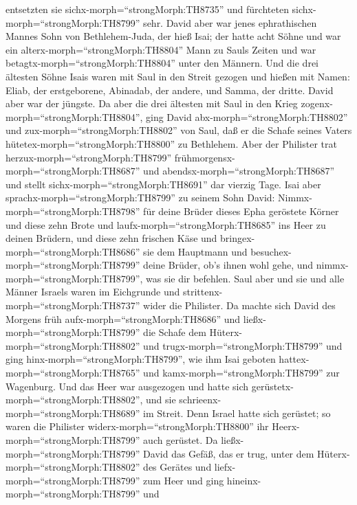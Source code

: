 entsetzten sie sichx-morph=``strongMorph:TH8735'' und fürchteten
sichx-morph=``strongMorph:TH8799'' sehr.  David aber war
jenes ephrathischen Mannes Sohn von Bethlehem-Juda, der hieß Isai; der
hatte acht Söhne und war ein alterx-morph=``strongMorph:TH8804'' Mann zu
Sauls Zeiten und war betagtx-morph=``strongMorph:TH8804'' unter den
Männern.  Und die drei ältesten Söhne Isais waren mit Saul
in den Streit gezogen und hießen mit Namen: Eliab, der erstgeborene,
Abinadab, der andere, und Samma, der dritte.  David aber
war der jüngste. Da aber die drei ältesten mit Saul in den Krieg
zogenx-morph=``strongMorph:TH8804'',  ging David
abx-morph=``strongMorph:TH8802'' und zux-morph=``strongMorph:TH8802''
von Saul, daß er die Schafe seines Vaters
hütetex-morph=``strongMorph:TH8800'' zu Bethlehem.  Aber
der Philister trat herzux-morph=``strongMorph:TH8799''
frühmorgensx-morph=``strongMorph:TH8687'' und
abendsx-morph=``strongMorph:TH8687'' und stellt
sichx-morph=``strongMorph:TH8691'' dar vierzig Tage.  Isai
aber sprachx-morph=``strongMorph:TH8799'' zu seinem Sohn David:
Nimmx-morph=``strongMorph:TH8798'' für deine Brüder dieses Epha
geröstete Körner und diese zehn Brote und
laufx-morph=``strongMorph:TH8685'' ins Heer zu deinen Brüdern,
 und diese zehn frischen Käse und
bringex-morph=``strongMorph:TH8686'' sie dem Hauptmann und
besuchex-morph=``strongMorph:TH8799'' deine Brüder, ob's ihnen wohl
gehe, und nimmx-morph=``strongMorph:TH8799'', was sie dir befehlen.
 Saul aber und sie und alle Männer Israels waren im
Eichgrunde und strittenx-morph=``strongMorph:TH8737'' wider die
Philister.  Da machte sich David des Morgens früh
aufx-morph=``strongMorph:TH8686'' und ließx-morph=``strongMorph:TH8799''
die Schafe dem Hüterx-morph=``strongMorph:TH8802'' und
trugx-morph=``strongMorph:TH8799'' und ging
hinx-morph=``strongMorph:TH8799'', wie ihm Isai geboten
hattex-morph=``strongMorph:TH8765'' und
kamx-morph=``strongMorph:TH8799'' zur Wagenburg. Und das Heer war
ausgezogen und hatte sich gerüstetx-morph=``strongMorph:TH8802'', und
sie schrieenx-morph=``strongMorph:TH8689'' im Streit.  Denn
Israel hatte sich gerüstet; so waren die Philister
widerx-morph=``strongMorph:TH8800'' ihr
Heerx-morph=``strongMorph:TH8799'' auch gerüstet.  Da
ließx-morph=``strongMorph:TH8799'' David das Gefäß, das er trug, unter
dem Hüterx-morph=``strongMorph:TH8802'' des Gerätes und
liefx-morph=``strongMorph:TH8799'' zum Heer und ging
hineinx-morph=``strongMorph:TH8799'' und
